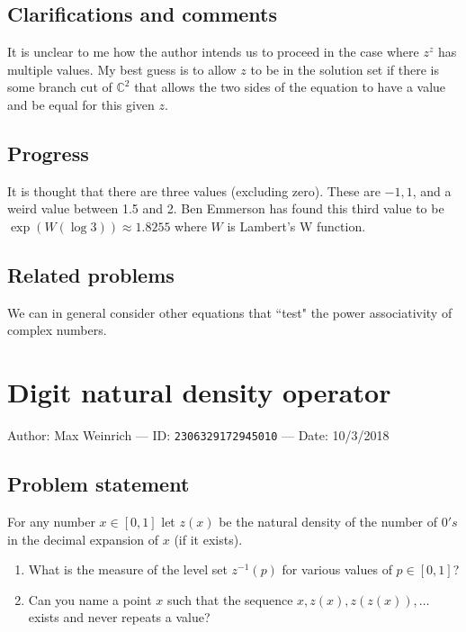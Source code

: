 \documentclass[10pt]{article}
\begin{document}
\subsection{Clarifications and comments}

It is unclear to me how the author intends us to proceed in the case where $z^z$ has multiple values. My best guess is to allow $z$ to be in the solution set if there is some branch cut of $\mathbb{C}^2$ that allows the two sides of the equation to have a value and be equal for this given $z$.

\subsection{Progress}

It is thought that there are three values (excluding zero). These are $-1, 1$, and a weird value between 1.5 and 2. Ben Emmerson has found this third value to be $\exp(W(\log 3))\approx 1.8255$ where $W$ is Lambert's W function.

\subsection{Related problems}

We can in general consider other equations that ``test" the power associativity of complex numbers.

\pagebreak

\section{Digit natural density operator}

Author: Max Weinrich --- ID: \verb`2306329172945010` --- Date: 10/3/2018

\subsection{Problem statement}

For any number $x\in[0,1]$ let $z(x)$ be the natural density of the number of $0's$ in the decimal expansion of $x$ (if it exists).

\begin{enumerate}
\item What is the measure of the level set $z^{-1}(p)$ for various values of $p\in[0,1]$?
\item Can you name a point $x$ such that the sequence $x,z(x),z(z(x)),\ldots$ exists and never repeats a value?
\end{enumerate}
\end{document}
